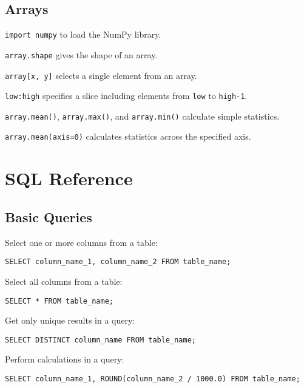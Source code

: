 \subsection*{Arrays}

\begin{swcitemize}
\item
  \texttt{import numpy} to load the NumPy library.
\item
  \texttt{array.shape} gives the shape of an array.
\item
  \texttt{array{[}x, y{]}} selects a single element from an array.
\item
  \texttt{low:high} specifies a slice including elements from
  \texttt{low} to \texttt{high-1}.
\item
  \texttt{array.mean()}, \texttt{array.max()}, and \texttt{array.min()}
  calculate simple statistics.
\item
  \texttt{array.mean(axis=0)} calculates statistics across the specified
  axis.
\end{swcitemize}

\section{SQL Reference}

\subsection*{Basic Queries}

Select one or more columns from a table:

\begin{Verbatim}
SELECT column_name_1, column_name_2 FROM table_name;
\end{Verbatim}

Select all columns from a table:

\begin{Verbatim}
SELECT * FROM table_name;
\end{Verbatim}

Get only unique results in a query:

\begin{Verbatim}
SELECT DISTINCT column_name FROM table_name;
\end{Verbatim}

Perform calculations in a query:

\begin{Verbatim}
SELECT column_name_1, ROUND(column_name_2 / 1000.0) FROM table_name;
\end{Verbatim}

